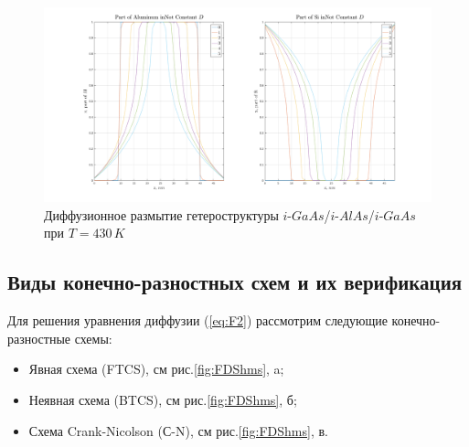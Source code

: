 \begin{figure}[h!]
	\centering
	\includegraphics[width=0.9\linewidth]{assets/DSi}
	\caption{Диффузионное размытие гетероструктуры $i$-$GaAs$/$i$-$AlAs$/$i$-$GaAs$ при $T = 430\,K$}
	\label{fig:DSi}
\end{figure}
\subsection{Виды конечно-разностных схем и их верификация}
Для решения уравнения диффузии (\ref{eq:F2}) рассмотрим следующие конечно-разностные схемы:
\begin{itemize}
	\item Явная схема (FTCS), см рис.\ref{fig:FDShms}, a;
	\item Неявная схема (BTCS), см рис.\ref{fig:FDShms}, б;
	\item Схема Crank-Nicolson (С-N), см рис.\ref{fig:FDShms}, в.
\end{itemize}

